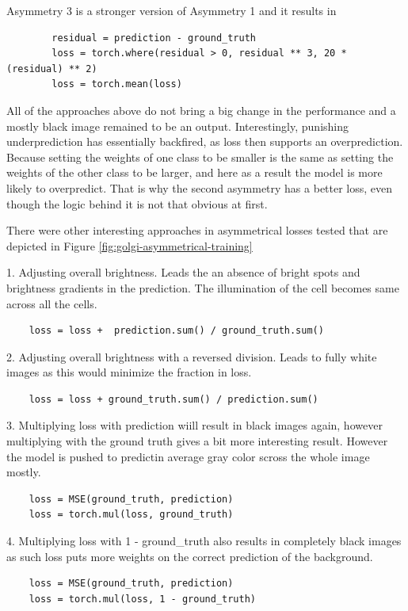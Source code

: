 Asymmetry 3 is a stronger version of Asymmetry 1 and it results in 
	\begin{lstlisting}
		residual = prediction - ground_truth
		loss = torch.where(residual > 0, residual ** 3, 20 * (residual) ** 2)
		loss = torch.mean(loss)
	  \end{lstlisting}

All of the approaches above do not bring a big change in the performance and a mostly black image remained to be an output. Interestingly, punishing underprediction has essentially backfired, as loss then supports an overprediction. Because setting the weights of one class to be smaller is the same as setting the weights of the other class to be larger, and here as a result the model is more likely to overpredict. That is why the second asymmetry has a better loss, even though the logic behind it is not that obvious at first. 

There were other interesting approaches in asymmetrical losses tested that are depicted in Figure \ref{fig:golgi-asymmetrical-training}

1. Adjusting overall brightness. Leads the an absence of bright spots and brightness gradients in the prediction. The illumination of the cell becomes same across all the cells.
\begin{lstlisting}
	loss = loss +  prediction.sum() / ground_truth.sum()
  \end{lstlisting}

2. Adjusting overall brightness with a reversed division. Leads to fully white images as this would minimize the fraction in loss.
\begin{lstlisting}
	loss = loss + ground_truth.sum() / prediction.sum()
\end{lstlisting}

3. Multiplying loss with prediction wiill result in black images again, however multiplying with the ground truth gives a bit more interesting result. However the model is pushed to predictin average gray color scross the whole image mostly.

\begin{lstlisting}
	loss = MSE(ground_truth, prediction)
	loss = torch.mul(loss, ground_truth)
\end{lstlisting}

4. Multiplying loss with 1 - ground\_truth also results in completely black images as such loss puts more weights on the correct prediction of the background.
\begin{lstlisting}
	loss = MSE(ground_truth, prediction)
	loss = torch.mul(loss, 1 - ground_truth)
\end{lstlisting}

